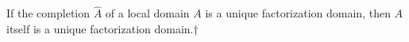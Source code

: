 If the completion $\hat{A}$ of a local domain $A$ is a unique factorization domain, then $A$ itself is a unique factorization domain.†